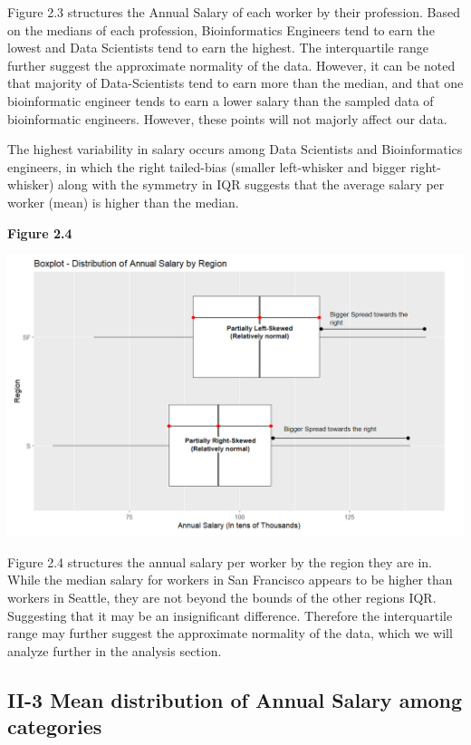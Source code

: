 \documentclass[
]{article}
\begin{document}
Figure 2.3 structures the Annual Salary of each worker by their
profession. Based on the medians of each profession, Bioinformatics
Engineers tend to earn the lowest and Data Scientists tend to earn the
highest. The interquartile range further suggest the approximate
normality of the data. However, it can be noted that majority of
Data-Scientists tend to earn more than the median, and that one
bioinformatic engineer tends to earn a lower salary than the sampled
data of bioinformatic engineers. However, these points will not majorly
affect our data.

The highest variability in salary occurs among Data Scientists and
Bioinformatics engineers, in which the right tailed-bias (smaller
left-whisker and bigger right-whisker) along with the symmetry in IQR
suggests that the average salary per worker (mean) is higher than the
median.

\textbf{Figure 2.4}

\includegraphics[width=7.29167in,height=\textheight]{Region Data Boxplot.png}

Figure 2.4 structures the annual salary per worker by the region they
are in. While the median salary for workers in San Francisco appears to
be higher than workers in Seattle, they are not beyond the bounds of the
other regions IQR. Suggesting that it may be an insignificant
difference. Therefore the interquartile range may further suggest the
approximate normality of the data, which we will analyze further in the
analysis section.

\subsection{II-3 Mean distribution of Annual Salary among
categories}\label{ii-3-mean-distribution-of-annual-salary-among-categories}
\end{document}
